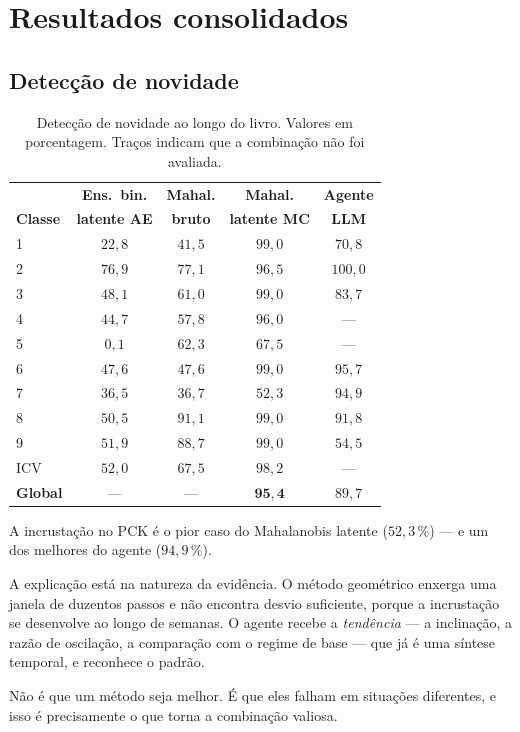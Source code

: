 \section{Resultados consolidados}

\subsection{Detecção de novidade}

\begin{table}[htbp]
\centering
\caption{Detecção de novidade ao longo do livro. Valores em porcentagem. Traços indicam
que a combinação não foi avaliada.}
\label{tab:sint-novidade}
\small
\begin{tabular}{lcccc}
\toprule
& \textbf{Ens.\ bin.} & \textbf{Mahal.} & \textbf{Mahal.} & \textbf{Agente} \\
\textbf{Classe} & \textbf{latente AE} & \textbf{bruto} & \textbf{latente MC} & \textbf{LLM} \\
\midrule
1 & $22{,}8$ & $41{,}5$ & $99{,}0$ & $70{,}8$ \\
2 & $76{,}9$ & $77{,}1$ & $96{,}5$ & $100{,}0$ \\
3 & $48{,}1$ & $61{,}0$ & $99{,}0$ & $83{,}7$ \\
4 & $44{,}7$ & $57{,}8$ & $96{,}0$ & --- \\
5 & $0{,}1$  & $62{,}3$ & $67{,}5$ & --- \\
6 & $47{,}6$ & $47{,}6$ & $99{,}0$ & $95{,}7$ \\
7 & $36{,}5$ & $36{,}7$ & $52{,}3$ & $94{,}9$ \\
8 & $50{,}5$ & $91{,}1$ & $99{,}0$ & $91{,}8$ \\
9 & $51{,}9$ & $88{,}7$ & $99{,}0$ & $54{,}5$ \\
ICV & $52{,}0$ & $67{,}5$ & $98{,}2$ & --- \\
\midrule
\textbf{Global} & --- & --- & $\bm{95{,}4}$ & $89{,}7$ \\
\bottomrule
\end{tabular}
\end{table}

\begin{destaque}
A incrustação no PCK é o pior caso do Mahalanobis latente ($52{,}3\,\%$) --- e um dos
melhores do agente ($94{,}9\,\%$).

A explicação está na natureza da evidência. O método geométrico enxerga uma janela de
duzentos passos e não encontra desvio suficiente, porque a incrustação se desenvolve ao
longo de semanas. O agente recebe a \emph{tendência} --- a inclinação, a razão de
oscilação, a comparação com o regime de base --- que já é uma síntese temporal, e
reconhece o padrão.

Não é que um método seja melhor. É que eles falham em situações diferentes, e isso é
precisamente o que torna a combinação valiosa.
\end{destaque}

